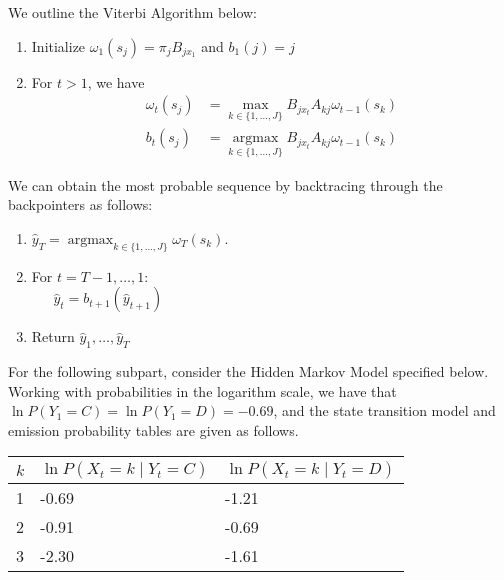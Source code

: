 \documentclass[11pt,addpoints,answers]{exam}
\newcommand \argmax {\operatorname*{argmax}}
\begin{document}
\begin{questions}
\begin{parts}
We outline the Viterbi Algorithm below:
\begin{enumerate}
    \item Initialize $\omega_1(s_j) = \pi_{j} B_{jx_{1}}$ and $b_1(j) = j$
    \item For $t > 1$, we have 
    \begin{align*}
        \omega_t(s_j) &= \max_{k \in \{1,\dots,J\}} B_{j x_{t}} A_{kj} \omega_{t-1}(s_k) \\
        b_t(s_j) &= \argmax_{k \in \{1,\dots,J\}} B_{j x_{t}} A_{kj} \omega_{t-1}(s_k)
    \end{align*}
\end{enumerate}

We can obtain the most probable sequence by backtracing through the backpointers as follows:
\begin{enumerate}
    \item $\hat{y}_T = \argmax_{k \in \{1,\dots,J\}} \omega_T(s_k)$. 
    \item For $t = T-1,\dots,1$: \\
    $~~~~~~~\hat{y}_{t} = b_{t+1}(\hat{y}_{t+1})$
    \item Return $\hat{y}_1, \dots, \hat{y}_T$
\end{enumerate}
\clearpage
For the following subpart, consider the Hidden Markov Model specified below. Working with probabilities in the logarithm scale, we have that $\ln{P(Y_1=C)} = \ln{P(Y_1=D)} = -0.69$, and the state transition model and emission probability tables are given as follows.

\begin{center}
\end{center}
\begin{table}[h!]
\centering
\begin{tabular}{|l|l|l|}
\hline
\multicolumn{1}{|c|}{$k$} & \multicolumn{1}{c|}{$\ln{P(X_t=k\mid Y_t=C)}$} & $\ln{P(X_t=k \mid Y_t=D)}$ \\ \hline
1                           & -0.69                           & -1.21      \\ \hline
2                           & -0.91                           & -0.69         \\ \hline
3                           & -2.30                           & -1.61      \\ \hline
\end{tabular}
\end{table}


\end{parts}
\end{questions}
\end{document}
